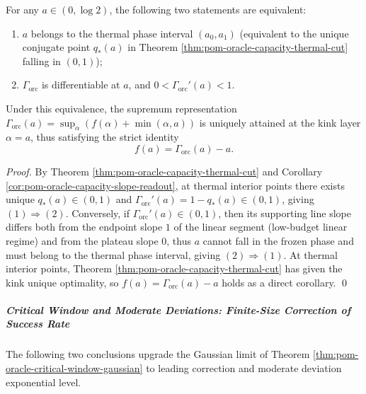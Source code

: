 \begin{theorem}\label{thm:pom-oracle-thermal-point-criteria}
For any \(a\in(0,\log 2)\), the following two statements are equivalent:
\begin{enumerate}
  \item \(a\) belongs to the thermal phase interval \((a_0,a_1)\) (equivalent to the unique conjugate point \(q_*(a)\) in Theorem \ref{thm:pom-oracle-capacity-thermal-cut} falling in \((0,1)\));
  \item \(\Gamma_{\mathrm{orc}}\) is differentiable at \(a\), and \(0<\Gamma_{\mathrm{orc}}'(a)<1\).
\end{enumerate}
Under this equivalence, the supremum representation
\(
\Gamma_{\mathrm{orc}}(a)=\sup_{\alpha}(f(\alpha)+\min(\alpha,a))
\)
is uniquely attained at the kink layer \(\alpha=a\), thus satisfying the strict identity
\[
\boxed{\;f(a)=\Gamma_{\mathrm{orc}}(a)-a.\;}
\]
\end{theorem}
\begin{proof}
By Theorem \ref{thm:pom-oracle-capacity-thermal-cut} and Corollary \ref{cor:pom-oracle-capacity-slope-readout},
at thermal interior points there exists unique \(q_*(a)\in(0,1)\) and \(\Gamma_{\mathrm{orc}}'(a)=1-q_*(a)\in(0,1)\), giving \((1)\Rightarrow(2)\).
Conversely, if \(\Gamma_{\mathrm{orc}}'(a)\in(0,1)\), then its supporting line slope differs both from the endpoint slope \(1\) of the linear segment (low-budget linear regime) and from the plateau slope \(0\), thus \(a\) cannot fall in the frozen phase and must belong to the thermal phase interval, giving \((2)\Rightarrow(1)\).
At thermal interior points, Theorem \ref{thm:pom-oracle-capacity-thermal-cut} has given the kink unique optimality, so \(f(a)=\Gamma_{\mathrm{orc}}(a)-a\) holds as a direct corollary. \qed
\end{proof}

\subparagraph{Critical Window and Moderate Deviations: Finite-Size Correction of Success Rate}
The following two conclusions upgrade the Gaussian limit of Theorem \ref{thm:pom-oracle-critical-window-gaussian} to leading correction and moderate deviation exponential level.

